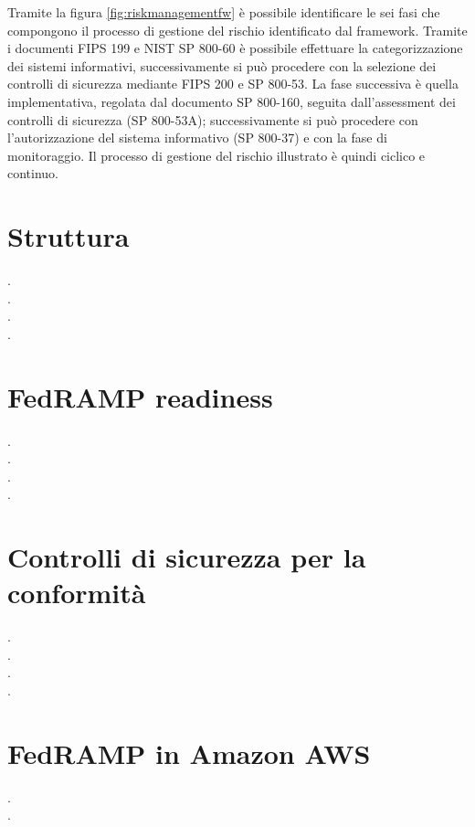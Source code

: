 \documentclass[../main.tex]{subfiles}
\begin{document}
Tramite la figura \ref{fig:riskmanagementfw} è possibile identificare le sei fasi che compongono il processo di gestione del rischio identificato dal framework.
Tramite i documenti FIPS 199 e NIST SP 800-60 è possibile effettuare la categorizzazione dei sistemi informativi, successivamente si può procedere con la selezione dei controlli di sicurezza mediante FIPS 200 e SP 800-53. La fase successiva è quella implementativa, regolata dal documento SP 800-160, seguita dall'assessment dei controlli di sicurezza (SP 800-53A); successivamente si può procedere con l'autorizzazione del sistema informativo (SP 800-37) e con la fase di monitoraggio.
Il processo di gestione del rischio illustrato è quindi ciclico e continuo.


\section{Struttura}
.\\\newpage
.\\\newpage
.\\\newpage
.\\\newpage
\section{FedRAMP readiness}
.\\\newpage
.\\\newpage
.\\\newpage
.\\\newpage
\section{Controlli di sicurezza per la conformità}
.\\\newpage
.\\\newpage
.\\\newpage
.\\\newpage
\section{FedRAMP in Amazon AWS}
.\\\newpage
.\\\newpage
\end{document}
